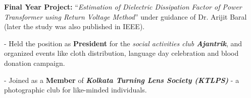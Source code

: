 
%



\textbf{Final Year Project:} “\textit{Estimation of Dielectric Dissipation Factor of Power Transformer using Return Voltage Method}” under guidance of Dr. Arijit Baral (later the study was also published in IEEE).


- Held the position as \textbf{President} for the \textit{social activities club \textbf{Ajantrik}}, and organized events like cloth distribution, language day celebration and blood donation campaign.

- Joined as a \textbf{Member} of \textbf{\textit{Kolkata Turning Lens Society (KTLPS)}} - a photographic club for like-minded individuals.

